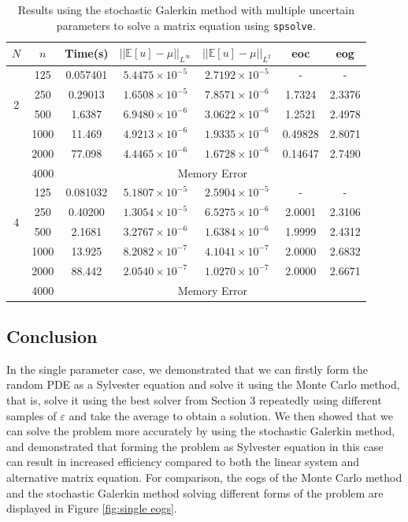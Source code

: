 \documentclass[11pt]{article}
\numberwithin{equation}{section}
\begin{document}
\begin{table}[H]
\centering
\begin{tabular}{|c|c|c|c|c|c|c|}
\hline
$N$ & $n$ & Time(s) & $|| \mathbb{E}[u] - \mu ||_{L^{\infty}}$ & $|| \mathbb{E}[u] - \mu ||_{L^{2}}$ & eoc & eog \\
\hline
\multirow{4}{*}{2} & 125 & 0.057401 & $5.4475 \times 10^{-5}$ & $2.7192 \times 10^{-5}$ & - & - \\
& 250 & 0.29013 & $1.6508 \times 10^{-5}$ & $7.8571 \times 10^{-6}$ & 1.7324 & 2.3376 \\
& 500 & 1.6387 & $6.9480 \times 10^{-6}$ & $3.0622 \times 10^{-6}$ & 1.2521 & 2.4978 \\
& 1000 & 11.469 & $4.9213 \times 10^{-6}$ & $1.9335 \times 10^{-6}$ & 0.49828 & 2.8071 \\
& 2000 & 77.098 & $4.4465 \times 10^{-6}$ & $1.6728 \times 10^{-6}$ & 0.14647 & 2.7490 \\
\cline{3-7}
& 4000 & \multicolumn{5}{c|}{Memory Error} \\
\hline
\multirow{4}{*}{4} & 125 & 0.081032 & $5.1807 \times 10^{-5}$ & $2.5904 \times 10^{-5}$ & - & - \\
& 250 & 0.40200 & $1.3054 \times 10^{-5}$ & $6.5275 \times 10^{-6}$ & 2.0001 & 2.3106 \\
& 500 & 2.1681 & $3.2767 \times 10^{-6}$ & $1.6384 \times 10^{-6}$ & 1.9999 & 2.4312 \\
& 1000 & 13.925 & $8.2082 \times 10^{-7}$ & $4.1041 \times 10^{-7}$ & 2.0000 & 2.6832 \\
& 2000 & 88.442 & $2.0540 \times 10^{-7}$ & $1.0270 \times 10^{-7}$ & 2.0000 & 2.6671 \\
\cline{3-7}
& 4000 & \multicolumn{5}{c|}{Memory Error} \\
\hline
\end{tabular}
\captionsetup{justification=centering}
\caption{Results using the stochastic Galerkin method with multiple uncertain parameters to solve a matrix equation using \texttt{spsolve}.}
\label{table:galerkin multiple matrix}
\end{table}

\newpage

\subsection{Conclusion}

In the single parameter case, we demonstrated that we can firstly form the random PDE as a Sylvester equation and solve it using the Monte Carlo method, that is, solve it using the best solver from Section 3 repeatedly using different samples of $\varepsilon$ and take the average to obtain a solution. We then showed that we can solve the problem more accurately by using the stochastic Galerkin method, and demonstrated that forming the problem as Sylvester equation in this case can result in increased efficiency compared to both the linear system and alternative matrix equation. For comparison, the eogs of the Monte Carlo method and the stochastic Galerkin method solving different forms of the problem are displayed in Figure \ref{fig:single eogs}.
\end{document}
